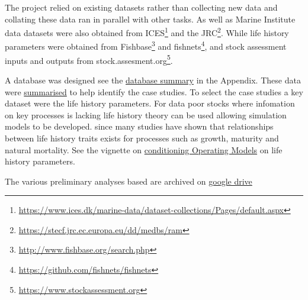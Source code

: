 The project relied on existing datasets rather than collecting new data and collating these data ran in parallel with other tasks. As well as Marine Institute data datasets were also obtained from ICES\footnote{\url{https://www.ices.dk/marine-data/dataset-collections/Pages/default.aspx}} and the JRC\footnote{\url{https://stecf.jrc.ec.europa.eu/dd/medbs/ram}}. While life history parameters were obtained from Fishbase\footnote{\url{http://www.fishbase.org/search.php}} and fishnets\footnote{\url{https://github.com/fishnets/fishnets}}, and stock assessment inputs and outputs from stock.assesment.org\footnote{\url{https://www.stockassessment.org}}.

A database was designed see the \hyperref[appendix:db]{database summary} in the Appendix. These data were \href{https://3o2y9wugzp1kfxr5hvzgzq-on.drv.tw/MyDas/tasks/1/stockprioritisation.nb.html}{summarised} to help identify the case studies. To select the case studies a key dataset were the life history parameters. For data poor stocks where infomation on key processes is lacking life history theory can be used allowing simulation models to be developed. since many studies have shown that relationships between life history traits exists for processes such as growth, maturity and natural mortality. See the vignette on \href{https://3o2y9wugzp1kfxr5hvzgzq-on.drv.tw/MyDas/vignettes/conditioning.html}{conditioning Operating Models} on life history parameters. 

The various preliminary analyses based are archived on \href{https://drive.google.com/drive/folders/1pzXh8j-Y4dtJikFqP7RUuwBu0XY0a9ao?usp=sharing}{google drive} 


